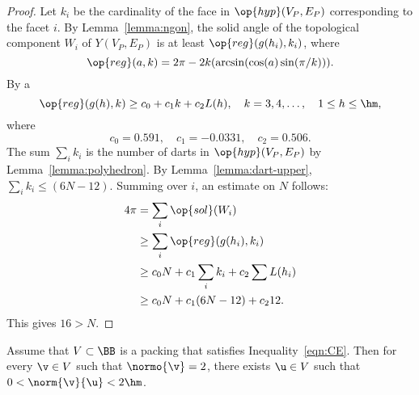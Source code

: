 \begin{proof}
Let $k_i$ be the cardinality of the face in $\op{hyp}(V_P,E_P)$
corresponding to the facet $i$.  By Lemma~\ref{lemma:ngon}, the solid
angle of the topological component $W_i$ of $Y(V_P,E_P)$ is at least
$\op{reg}(g(h_i),k_i)$, where %
%
%
\[  
\op{reg}(a,k) = 2\pi - 2 k (\arcsin(\cos(a)\sin(\pi/k))).
\] 
By a  
\begin{equation}\label{eqn:alin} 
\op{reg}(g(h),k) \ge c_0 + c_1 k + c_2 L(h),\quad
k = 3,4,\ldots,\quad 1\le h\le \hm,
\end{equation}
where
\[ 
c_0=0.591,\quad c_1=-0.0331,\quad c_2 = 0.506.
\] The sum $\sum_i k_i$ is the number of darts in $\op{hyp}(V_P,E_P)$
by Lemma~\ref{lemma:polyhedron}.  By Lemma~\ref{lemma:dart-upper},
$\sum_i k_i \le (6N-12)$.  Summing over $i$, an estimate on $N$
follows: %
%
\begin{align*} 
4\pi &= \sum_i\op{sol}(W_i)\\
&\ge \sum_i \op{reg}(g(h_i),k_i) \\
&\ge c_0 N +c_1\sum_i k_i + c_2 \sum L(h_i)\\
&\ge c_0 N +c_1 (6N-12) + c_2 12.
\end{align*}
This gives
$16 > N$.
\end{proof} 


\begin{lemma}[]\label{lemma:D'}  
  Assume that $V\subset \BB$ is a packing that satisfies
  Inequality~\ref{eqn:CE}.  Then
 for every $ \v\in V$ such that $\normo{ \v}=2$, there exists
  $\u\in V$ such that 
$0<\norm{ \v}{ \u}< 2\hm$. 
\end{lemma}

